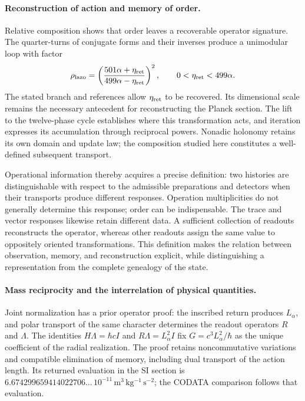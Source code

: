 \paragraph{Reconstruction of action and memory of order.}
Relative composition shows that order leaves a recoverable operator
signature. The quarter-turns of conjugate forms and their inverses
produce a unimodular loop with factor
\[
 \rho_{\rm lazo}=
 \left(\frac{501\alpha+\eta_{\rm ret}}
 {499\alpha-\eta_{\rm ret}}\right)^2,
 \qquad 0<\eta_{\rm ret}<499\alpha.
\]
The stated branch and references allow \(\eta_{\rm ret}\) to be
recovered. Its dimensional scale remains the necessary antecedent for
reconstructing the Planck section. The lift to the twelve-phase cycle
establishes where this transformation acts, and iteration expresses its
accumulation through reciprocal powers. Nonadic holonomy retains its own
domain and update law; the composition studied here constitutes a
well-defined subsequent transport.

Operational information thereby acquires a precise definition: two
histories are distinguishable with respect to the admissible preparations
and detectors when their transports produce different responses.
Operation multiplicities do not generally determine this response;
order can be indispensable. The trace and vector responses likewise
retain different data. A sufficient collection of readouts reconstructs
the operator, whereas other readouts assign the same value to oppositely
oriented transformations. This definition makes the relation between observation,
memory, and reconstruction explicit, while distinguishing a
representation from the complete genealogy of the state.

\paragraph{Mass reciprocity and the interrelation of physical quantities.}
Joint normalization has a prior operator proof: the inscribed return
produces $L_\alpha$, and polar transport of the same character determines
the readout operators $R$ and $\Lambda$.
The identities $H\Lambda=\hbar cI$ and $R\Lambda=L_\alpha^2I$ fix
$G=c^3L_\alpha^2/\hbar$ as the unique coefficient of the radial realization.
The proof retains noncommutative variations and compatible elimination
of memory, including dual transport of the action length.
Its returned evaluation in the SI section is
$6.674299659414022706\ldots\,10^{-11}\,\mathrm{m^3\,kg^{-1}\,s^{-2}}$;
the CODATA comparison follows that evaluation.

